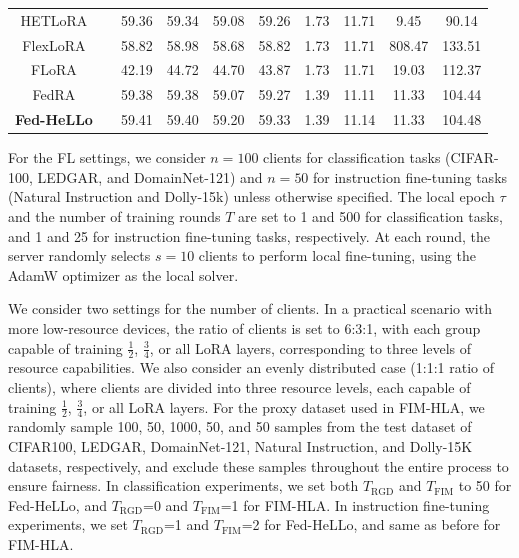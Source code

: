 \documentclass[lettersize,journal]{IEEEtran}
\begin{document}
\begin{table}[t]
{\begin{tabular}{c|c|cccc|cccc}
    HETLoRA &     & 59.36	&59.34	&59.08	&59.26  &  1.73     &11.71       & 9.45      &90.14  \\
    FlexLoRA &    &58.82	&58.98	&58.68	&58.82   & 1.73      & 11.71      & 808.47      &133.51  \\
    FLoRA &       &42.19	&44.72	&44.70	&43.87 &  1.73     &11.71       & 19.03      &112.37  \\
    FedRA &       &59.38	&59.38	&59.07	&59.27  &  1.39     &11.11       & 11.33      &104.44  \\
    \textbf{Fed-HeLLo} &       & \cellcolor[rgb]{ .749,  .749,  .749}59.41 & \cellcolor[rgb]{ .749,  .749,  .749}59.40 & \cellcolor[rgb]{ .749,  .749,  .749}59.20 & \cellcolor[rgb]{ .749,  .749,  .749}59.33 & 1.39      & 11.14      &11.33       & 104.48 \\
    \bottomrule[1pt]
  \end{tabular}%
    }
  \label{tab:main-dolly15k}%
\end{table}%

{For the FL settings, we consider $n=100$ clients for classification tasks (CIFAR-100, LEDGAR, and DomainNet-121) and $n=50$ for instruction fine-tuning tasks (Natural Instruction and Dolly-15k) unless otherwise specified. The local epoch $\tau$ and the number of training rounds $T$ are set to 1 and 500 for classification tasks, and 1 and 25 for instruction fine-tuning tasks, respectively. At each round, the server randomly selects $s=10$ clients to perform local fine-tuning, using the AdamW optimizer as the local solver.}

{We consider two settings for the number of clients. In a practical scenario with more low-resource devices, the ratio of clients is set to 6:3:1, with each group capable of training $\frac{1}{2}$, $\frac{3}{4}$, or all LoRA layers, corresponding to three levels of resource capabilities. We also consider an evenly distributed case (1:1:1 ratio of clients), where clients are divided into three resource levels, each capable of training $\frac{1}{2}$, $\frac{3}{4}$, or all LoRA layers. 
For the proxy dataset used in FIM-HLA, we randomly sample 100, 50, 1000, 50, and 50 samples from the test dataset of CIFAR100, LEDGAR, DomainNet-121, Natural Instruction, and Dolly-15K datasets, respectively, and exclude these samples throughout the entire process to ensure fairness.
In classification experiments, we set both $T_{\text{RGD}}$ and $T_{\text{FIM}}$ to 50 for Fed-HeLLo, and $T_{\text{RGD}}$=0 and $T_{\text{FIM}}$=1 for FIM-HLA. In instruction fine-tuning experiments, we set  $T_{\text{RGD}}$=1 and $T_{\text{FIM}}$=2 for Fed-HeLLo, and same as before for FIM-HLA.}
\end{document}
